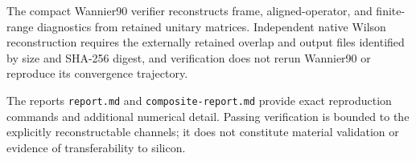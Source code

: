 The compact Wannier90 verifier reconstructs frame, aligned-operator, and finite-range
diagnostics from retained unitary matrices. Independent native Wilson reconstruction
requires the externally retained overlap and output files identified by size and
SHA-256 digest, and verification does not rerun Wannier90 or reproduce its convergence
trajectory.

The reports \texttt{report.md} and \texttt{composite-report.md} provide exact
reproduction commands and additional numerical detail. Passing verification is
bounded to the explicitly reconstructable channels; it does not constitute material
validation or evidence of transferability to silicon.

